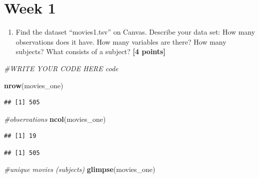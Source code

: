 \documentclass[
]{article}
\newenvironment{Shaded}{\begin{snugshade}}{\end{snugshade}}
\newcommand{\CommentTok}[1]{\textcolor[rgb]{0.56,0.35,0.01}{\textit{#1}}}
\newcommand{\FunctionTok}[1]{\textcolor[rgb]{0.13,0.29,0.53}{\textbf{#1}}}
\newcommand{\NormalTok}[1]{#1}
\newcommand{\SpecialCharTok}[1]{\textcolor[rgb]{0.81,0.36,0.00}{\textbf{#1}}}
\providecommand{\tightlist}{%
  \setlength{\itemsep}{0pt}\setlength{\parskip}{0pt}}
\begin{document}
\section{Week 1}\label{week-1}

\begin{enumerate}
\def\labelenumi{\arabic{enumi}.}
\tightlist
\item
  Find the dataset ``movies1.tsv'' on Canvas. Describe your data set:
  How many observations does it have. How many variables are there? How
  many subjects? What consists of a subject? \textbf{[4 points]}
\end{enumerate}

\begin{Shaded}
\begin{Highlighting}[]
\CommentTok{\#WRITE YOUR CODE HERE code }

\FunctionTok{nrow}\NormalTok{(movies\_one)              }
\end{Highlighting}
\end{Shaded}

\begin{verbatim}
## [1] 505
\end{verbatim}

\begin{Shaded}
\begin{Highlighting}[]
\CommentTok{\#observations }
\FunctionTok{ncol}\NormalTok{(movies\_one)              }
\end{Highlighting}
\end{Shaded}

\begin{verbatim}
## [1] 19
\end{verbatim}

\begin{Shaded}
\end{Shaded}

\begin{verbatim}
## [1] 505
\end{verbatim}

\begin{Shaded}
\begin{Highlighting}[]
\CommentTok{\#unique movies (subjects)}
\FunctionTok{glimpse}\NormalTok{(movies\_one)           }
\end{Highlighting}
\end{Shaded}
\end{document}
